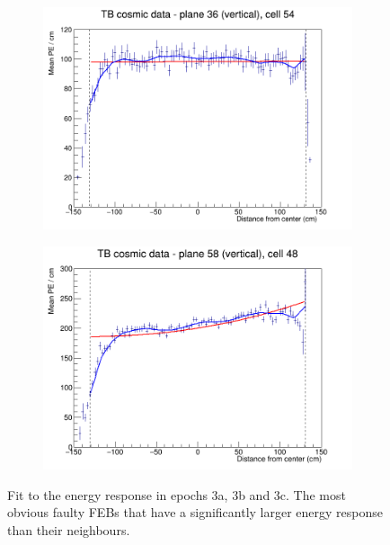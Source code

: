 \documentclass[12pt,a4paper]{article}
\begin{document}
\begin{figure}[h]
  \begin{subfigure}{0.5\textwidth}
    \includegraphics[width=\linewidth]{RelativeCalibrationResults/ep3abc_036_054.png}
  \end{subfigure}
  \begin{subfigure}{0.5\textwidth}
    \includegraphics[width=\linewidth]{RelativeCalibrationResults/ep3abc_058_048_ExtendedRange.png}
  \end{subfigure}
  \caption{Fit to the energy response in epochs 3a, 3b and 3c. The most obvious faulty FEBs that have a significantly larger energy response than their neighbours.}
  \label{figAttenfitResultsEpoch3abc_FaultyFEBs}
\end{figure}
\end{document}
